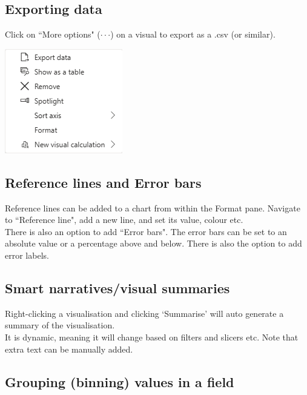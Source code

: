\documentclass[10pt, openany, twocolumn]{book}
\begin{document}
\subsection*{Exporting data}

Click on ``More options" ($\cdot \cdot \cdot$) on a visual to export as a .csv (or similar).

\begin{center}
    \includegraphics[width = 0.6\columnwidth]{images/moreOptions.png}
\end{center}

\subsection*{Reference lines and Error bars}

Reference lines can be added to a chart from within the Format pane. Navigate to ``Reference line", add a new line, and set its value, colour etc. \\

There is also an option to add ``Error bars". The error bars can be set to an absolute value or a percentage above and below. There is also the option to add error labels.

\subsection*{Smart narratives/visual summaries}

Right-clicking a visualisation and clicking `Summarise' will auto generate a summary of the visualisation. \\
It is dynamic, meaning it will change based on filters and slicers etc. Note that extra text can be manually added.

\subsection*{Grouping (binning) values in a field}
\end{document}
